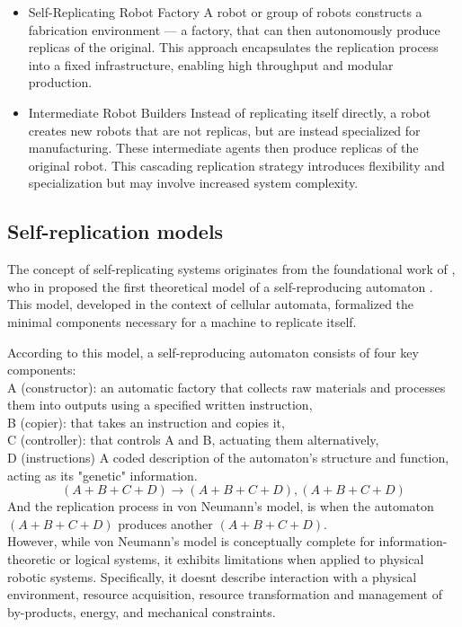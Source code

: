 \begin{itemize}
    \item Self-Replicating Robot Factory
        A robot or group of robots constructs a fabrication environment — a factory, 
        that can then autonomously produce replicas of the original.
        This approach encapsulates the replication process into a fixed 
        infrastructure, enabling high throughput and modular production.
    \item Intermediate Robot Builders
        Instead of replicating itself directly, a robot creates new robots 
        that are not replicas, but are instead specialized for manufacturing. 
        These intermediate agents then produce replicas of the original robot. 
        This cascading replication strategy introduces flexibility and specialization 
        but may involve increased system complexity.

\end{itemize}




\subsection{Self-replication models}
\label{ch:srrsModels}
The concept of self-replicating systems originates from the foundational work of 
\citeauthor{vonNeumann1962Theory}, who in \citeyear{vonNeumann1962Theory} proposed 
the first theoretical model of a self-reproducing automaton \cite{vonNeumann1962Theory}. 
This model, developed in the context of cellular automata, 
formalized the minimal components necessary for a machine to replicate itself.

According to this model, a self-reproducing automaton consists of four key components:\\
A (constructor): an automatic factory  that collects raw materials and processes them into outputs using a
specified written instruction, \\
B (copier): that takes an instruction and copies it,\\
C (controller): that controls A and B, actuating them alternatively,\\
D (instructions) A coded description of the automaton's structure and function, acting as its "genetic" information.\\
\[ (A + B + C + D) \rightarrow (A + B + C + D), (A + B + C + D) \]
And the replication process in von Neumann’s model, is when the automaton 
$ (A + B + C + D) $ produces another $ (A + B + C + D) $.\\
However, while von Neumann's model is conceptually complete for information-theoretic 
or logical systems, it exhibits limitations when applied to physical robotic systems. 
Specifically, it doesnt describe interaction with a physical environment, resource acquisition,
resource transformation and management of by-products, energy, and mechanical constraints.

